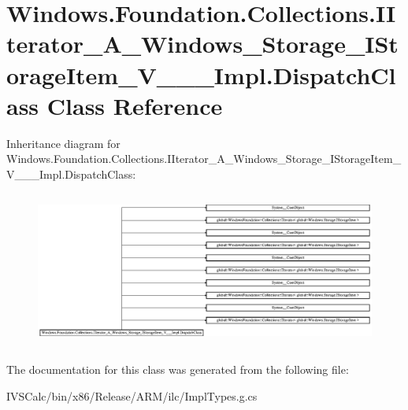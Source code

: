 \hypertarget{class_windows_1_1_foundation_1_1_collections_1_1_i_iterator___a___windows___storage___i_storage_d9182125ec06bcda931ae2c7c43f5ecc}{}\section{Windows.\+Foundation.\+Collections.\+I\+Iterator\+\_\+\+A\+\_\+\+Windows\+\_\+\+Storage\+\_\+\+I\+Storage\+Item\+\_\+\+V\+\_\+\+\_\+\+\_\+\+Impl.\+Dispatch\+Class Class Reference}
\label{class_windows_1_1_foundation_1_1_collections_1_1_i_iterator___a___windows___storage___i_storage_d9182125ec06bcda931ae2c7c43f5ecc}
Inheritance diagram for Windows.\+Foundation.\+Collections.\+I\+Iterator\+\_\+\+A\+\_\+\+Windows\+\_\+\+Storage\+\_\+\+I\+Storage\+Item\+\_\+\+V\+\_\+\+\_\+\+\_\+\+Impl.\+Dispatch\+Class\+:\begin{figure}[H]
\begin{center}
\leavevmode
\includegraphics[height=5.193929cm]{class_windows_1_1_foundation_1_1_collections_1_1_i_iterator___a___windows___storage___i_storage_d9182125ec06bcda931ae2c7c43f5ecc}
\end{center}
\end{figure}


The documentation for this class was generated from the following file\+:\begin{DoxyCompactItemize}
\item 
I\+V\+S\+Calc/bin/x86/\+Release/\+A\+R\+M/ilc/Impl\+Types.\+g.\+cs\end{DoxyCompactItemize}
